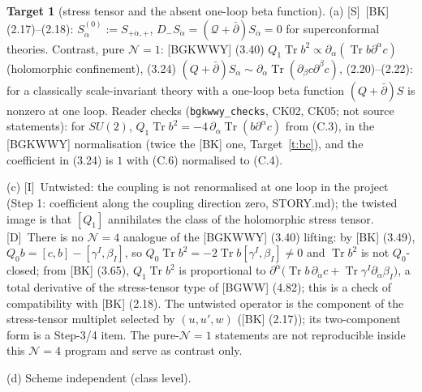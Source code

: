 \documentclass[11pt]{article}
\theoremstyle{definition}
\newtheorem{target}{Target}
\newcommand{\Tr}{\operatorname{Tr}}
\newcommand{\Sl}{\textup{[S]}}
\newcommand{\Dl}{\textup{[D]}}
\newcommand{\Il}{\textup{[I]}}
\begin{document}
\begin{target}[stress tensor and the absent one-loop beta function]\label{t:stress}
(a) \Sl\ [BK] (2.17)--(2.18): $S^{(0)}_{\dot\alpha}:=S_{+\dot\alpha,+}$, $D_-S_{\dot\alpha}=(\mathcal Q+\bar\partial)S_{\dot\alpha}=0$ for superconformal theories. Contrast, pure $\mathcal N=1$: [BGKWWY] (3.40) $Q_1\Tr b^2\propto\partial_\alpha(\Tr b\partial^\alpha c)$ (holomorphic confinement), (3.24) $(Q+\bar\partial)S_\alpha\sim\partial_\alpha\Tr(\partial_\beta c\partial^\beta c)$, (2.20)--(2.22): for a classically scale-invariant theory with a one-loop beta function $(Q+\bar\partial)S$ is nonzero at one loop. Reader checks (\texttt{bgkwwy\_checks}, CK02, CK05; not source statements): for $SU(2)$, $Q_1\Tr b^2=-4\,\partial_\alpha\Tr(b\partial^\alpha c)$ from (C.3), in the [BGKWWY] normalisation (twice the [BK] one, Target~\ref{t:bc}), and the coefficient in (3.24) is $1$ with (C.6) normalised to (C.4).

(c) \Il\ Untwisted: the coupling is not renormalised at one loop in the project (Step 1: coefficient along the coupling direction zero, STORY.md); the twisted image is that $[Q_1]$ annihilates the class of the holomorphic stress tensor. \Dl\ There is no $\mathcal N=4$ analogue of the [BGKWWY] (3.40) lifting: by [BK] (3.49), $Q_0b=[c,b]-[\gamma^I,\beta_I]$, so $Q_0\Tr b^2=-2\Tr b[\gamma^I,\beta_I]\neq0$ and $\Tr b^2$ is not $Q_0$-closed; from [BK] (3.65), $Q_1\Tr b^2$ is proportional to $\partial^{\dot\alpha}\big(\Tr b\,\partial_{\dot\alpha}c+\Tr\gamma^I\partial_{\dot\alpha}\beta_I\big)$, a total derivative of the stress-tensor type of [BGWW] (4.82); this is a check of compatibility with [BK] (2.18). The untwisted operator is the component of the stress-tensor multiplet selected by $(u,u',w)$ ([BK] (2.17)); its two-component form is a Step-3/4 item. The pure-$\mathcal N=1$ statements are not reproducible inside this $\mathcal N=4$ program and serve as contrast only.

(d) Scheme independent (class level).
\end{target}
\end{document}

